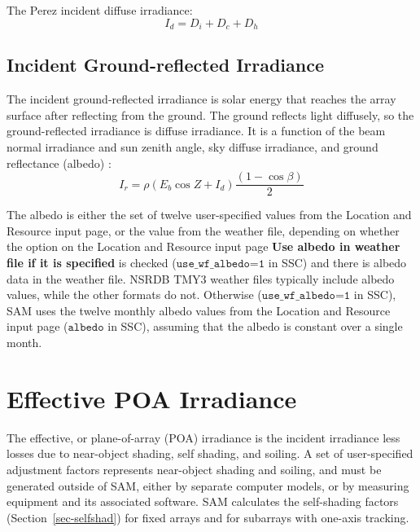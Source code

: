 \documentclass[12pt,letterpaper]{article}
\begin{document}
The Perez incident diffuse irradiance:
\begin{equation}
I_d = D_i + D_c + D_h
\end{equation}

\section{Incident Ground-reflected Irradiance}

The incident ground-reflected irradiance is solar energy that reaches the array surface after reflecting from the ground. The ground reflects light diffusely, so the ground-reflected irradiance is diffuse irradiance. It is a function of the beam normal irradiance and sun zenith angle, sky diffuse irradiance, and ground reflectance (albedo) \citep{liu1963}:
\begin{equation}
I_{r}= \mathit{\rho} \left( E_b \cos Z + I_d \right) \frac{( 1 - \cos\beta )}{2}
\end{equation}

The albedo is either the set of twelve user-specified values from the Location and Resource input page, or the value from the weather file, depending on whether the option on the Location and Resource input page \textbf{Use albedo in weather file if it is specified} is checked ($\texttt{use\_wf\_albedo=1}$ in SSC) and there is albedo data in the weather file. NSRDB TMY3 weather files typically include albedo values, while the other formats do not. Otherwise ($\texttt{use\_wf\_albedo=1}$ in SSC), SAM uses the twelve monthly albedo values from the Location and Resource input page ($\texttt{albedo}$ in SSC), assuming that the albedo is constant over a single month.

\chapter{Effective POA Irradiance}\label{sec-effectiveirradiance}

The effective, or plane-of-array (POA) irradiance is the incident irradiance less losses due to near-object shading, self shading, and soiling. A set of user-specified adjustment factors represents near-object shading and soiling, and must be generated outside of SAM, either by separate computer models, or by measuring equipment and its associated software. SAM calculates the self-shading factors (Section~\ref{sec-selfshad}) for fixed arrays and for subarrays with one-axis tracking.
\end{document}
